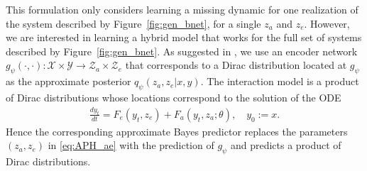 \documentclass{article}
\newcommand\figref{Figure~\ref}
\begin{document}
This formulation only considers learning a missing dynamic for one realization of the system described by \figref{fig:gen_bnet}, for a single $z_a$ and $z_e$. However, we are interested in learning a hybrid model that works for the full set of systems described by \figref{fig:gen_bnet}. As suggested in \citet{APHYNITY}, we use an encoder network $g_\psi(\cdot, \cdot): \mathcal{X} \times \mathcal{Y} \rightarrow \mathcal{Z}_a \times \mathcal{Z}_e$ that corresponds to a Dirac distribution located at $g_\psi$ as the approximate posterior $q_\psi(z_a, z_e|x, y)$. The interaction model is a product of Dirac distributions whose locations correspond to the solution of the ODE 
\begin{align}
    \frac{dy_t}{dt} = F_e(y_t, z_e) + F_a(y_t, z_a; \theta), \quad y_0:=x.
    \label{eq:APH_ae}
\end{align} 
Hence the corresponding approximate Bayes predictor replaces the parameters $(z_a, z_e)$ in \eqref{eq:APH_ae} with the prediction of $g_\psi$ and predicts a product of Dirac distributions.
\end{document}
